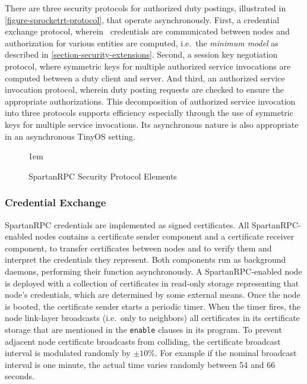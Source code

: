 There are three security protocols for authorized duty postings, illustrated in
\autoref{figure-sprocketrt-protocol}, that operate asynchronously. First, a credential exchange
protocol, wherein \RT\ credentials are communicated between nodes and authorization for various
entities are computed, i.e.~the \emph{minimum model} as described in
\autoref{section-security-extensions}. Second, a session key negotiation protocol, where
symmetric keys for multiple authorized service invocations are computed between a duty client
and server. And third, an authorized service invocation protocol, wherein duty posting requests
are checked to ensure the appropriate authorizations. This decomposition of authorized service
invocation into three protocols supports efficiency especially through the use of symmetric keys
for multiple service invocations. Its asynchronous nature is also appropriate in an asynchronous
TinyOS setting.

\begin{figure}[t]
  
  \centerline{\raise 1em\box\graph}
  \vspace{2mm}
  \caption{SpartanRPC Security Protocol Elements}
  \label{figure-sprocketrt-protocol}
\end{figure}

\subsubsection{Credential Exchange}
\label{section-certificate-format}

SpartanRPC credentials are implemented as signed certificates. All SpartanRPC-enabled nodes
contains a certificate sender component and a certificate receiver component, to transfer
certificates between nodes and to verify them and interpret the credentials they represent. Both
components run as background daemons, performing their function asynchronously. A
SpartanRPC-enabled node is deployed with a collection of certificates in read-only storage
representing that node's credentials, which are determined by some external means. Once the node
is booted, the certificate sender starts a periodic timer. When the timer fires, the node
link-layer broadcasts (i.e.~only to neighbors) all certificates in its certificate storage that
are mentioned in the \texttt{enable} clauses in its program. To prevent adjacent node
certificate broadcasts from colliding, the certificate broadcast interval is modulated randomly
by $\pm 10$\%. For example if the nominal broadcast interval is one minute, the actual time
varies randomly between 54 and 66 seconds.

